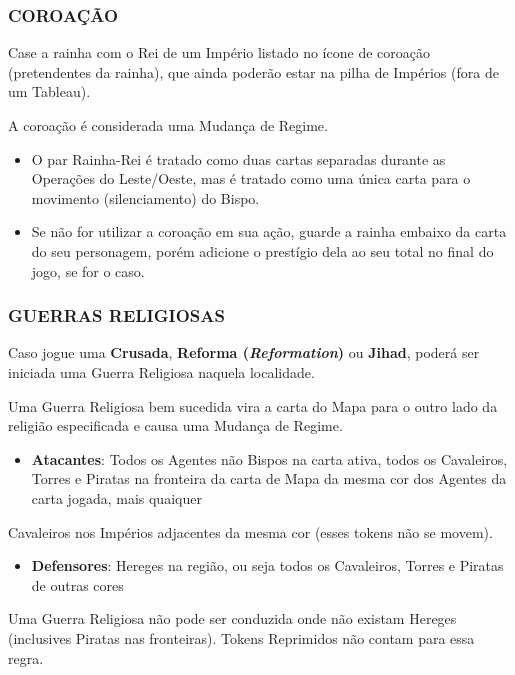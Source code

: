 \documentclass[11pt]{article}
\begin{document}
\subsubsection{COROAÇÃO}
\label{sec:org44abf1f}

Case a rainha com o Rei de um Império listado no ícone de coroação (pretendentes da rainha), que ainda poderão estar na pilha de Impérios (fora de um Tableau).

A coroação é considerada uma Mudança de Regime.

\begin{itemize}
\item O par Rainha-Rei é tratado como duas cartas separadas durante as Operações do Leste/Oeste, mas é tratado como uma única carta para o movimento (silenciamento) do Bispo.

\item Se não for utilizar a coroação em sua ação, guarde a rainha embaixo da carta do seu personagem, porém adicione o prestígio dela ao seu total no final do jogo, se for o caso.
\end{itemize}

\subsubsection{GUERRAS RELIGIOSAS}
\label{sec:org9a636ec}

Caso jogue uma \textbf{Crusada}, \textbf{Reforma (\emph{Reformation})} ou \textbf{Jihad}, poderá ser iniciada uma Guerra Religiosa naquela localidade.

Uma Guerra Religiosa bem sucedida vira a carta do Mapa para o outro lado da religião especificada e causa uma Mudança de Regime.

\begin{itemize}
\item \textbf{Atacantes}: Todos os Agentes não Bispos na carta ativa, todos os Cavaleiros, Torres e Piratas na fronteira da carta de Mapa da mesma cor dos Agentes da carta jogada, mais quaiquer
\end{itemize}
Cavaleiros nos Impérios adjacentes da mesma cor (esses tokens não se movem).

\begin{itemize}
\item \textbf{Defensores}: Hereges na região, ou seja todos os Cavaleiros, Torres e Piratas de outras cores
\end{itemize}

Uma Guerra Religiosa não pode ser conduzida onde não existam Hereges (inclusives Piratas nas fronteiras). Tokens Reprimidos não contam para essa regra.
\end{document}
